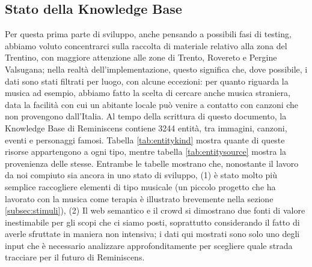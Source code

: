 \documentclass[sigproc-sp.tex]{subfiles}
\begin{document}
\subsection{Stato della Knowledge Base}
Per questa prima parte di sviluppo, anche pensando a possibili fasi di testing, abbiamo voluto concentrarci sulla raccolta di materiale relativo alla zona del Trentino, con maggiore attenzione alle zone di Trento, Rovereto e Pergine Valsugana; nella realtà dell’implementazione, questo significa che, dove possibile, i dati sono stati filtrati per luogo, con alcune eccezioni: per quanto riguarda la musica ad esempio, abbiamo fatto la scelta di cercare anche musica straniera, data la facilità con cui un abitante locale può venire a contatto con canzoni che non provengono dall’Italia. Al tempo della scrittura di questo documento, la Knowledge Base di Reminiscens contiene 3244 entità, tra immagini, canzoni, eventi e personaggi famosi. Tabella \ref{tab:entitykind} mostra quante di queste risorse appartengono a ogni tipo, mentre tabella \ref{tab:entitysource} mostra la provenienza delle stesse. Entrambe le tabelle mostrano che, nonostante il lavoro da noi compiuto sia ancora in uno stato di sviluppo, (1) è stato molto più semplice raccogliere elementi di tipo musicale (un piccolo progetto che ha lavorato con la musica come terapia è illustrato brevemente nella sezione \ref{subsec:stimuli}), (2) Il web semantico e il crowd si dimostrano due fonti di valore inestimabile per gli scopi che ci siamo posti, soprattutto considerando il fatto di averle sfruttate in maniera non intensiva; i dati qui mostrati sono solo uno degli input che è necessario analizzare approfonditamente per scegliere quale strada tracciare per il futuro di Reminiscens.
\end{document}
